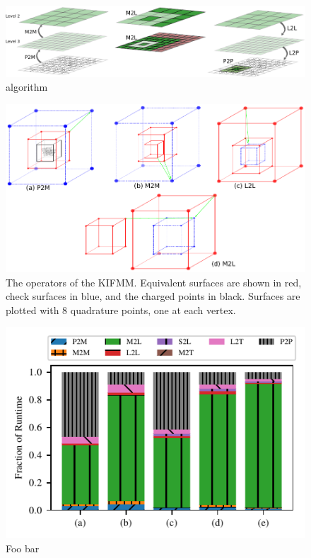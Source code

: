 \documentclass{IEEEcsmag}
\begin{document}
\begin{figure}
	\centerline{\includegraphics {figures/algorithm.pdf}}
	\caption{algorithm}
	\label{fig:agorithm}
\end{figure}

\begin{figure}
	\centerline{\includegraphics {figures/operators.pdf}}
	\caption{The operators of the KIFMM. Equivalent surfaces are shown in red, check surfaces in blue, and the charged points in black. Surfaces are plotted with 8 quadrature points, one at each vertex.}
	\label{fig:operators}
\end{figure}
\begin{figure}
	\centerline{\includegraphics {figures/operator_runtimes.pdf}}
	\caption{Foo bar}
	\label{fig:operator_runtimes}
\end{figure}
\end{document}
